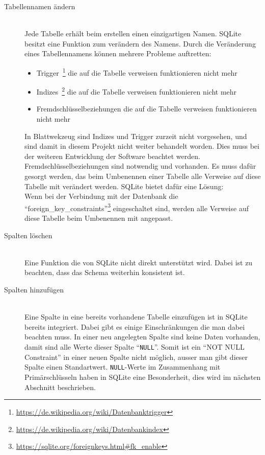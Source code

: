 \begin{description}
\item[Tabellennamen ändern] \hfill\\
Jede Tabelle erhält beim erstellen einen einzigartigen Namen. SQLite besitzt eine Funktion zum verändern des Namens.
Durch die Veränderung eines Tabellennamens können mehrere Probleme auftretten:
\begin{itemize}
    \item Trigger~\footnote{\url{https://de.wikipedia.org/wiki/Datenbanktrigger}} die auf die Tabelle verweisen funktionieren nicht mehr
    \item Indizes~\footnote{\url{https://de.wikipedia.org/wiki/Datenbankindex}} die auf die Tabelle verweisen funktionieren nicht mehr
    \item Fremdschlüsselbeziehungen die auf die Tabelle verweisen funktionieren nicht mehr
\end{itemize}
In Blattwekzeug sind Indizes und Trigger zurzeit nicht vorgesehen, und sind damit in diesem Projekt nicht weiter behandelt worden. Dies muss bei der weiteren Entwicklung der Software beachtet werden.
Fremdschlüsselbeziehungen sind notwendig und vorhanden. Es muss dafür gesorgt werden, das beim Umbenennen einer Tabelle alle Verweise auf diese Tabelle mit verändert werden. SQLite bietet dafür eine Lösung: \\
Wenn bei der Verbindung mit der Datenbank die ``foreign\_key\_constraints''\footnote{\url{https://sqlite.org/foreignkeys.html\#fk_enable}} eingeschaltet sind, werden alle Verweise auf diese Tabelle beim Umbenennen mit angepasst.\cite{sqlite_doc_alter}

\item[Spalten löschen] \hfill\\
Eine Funktion die von SQLite nicht direkt unterstützt wird. Dabei ist zu beachten, dass das Schema weiterhin konsistent ist.

\item[Spalten hinzufügen] \hfill\\
Eine Spalte in eine bereits vorhandene Tabelle einzufügen ist in SQLite bereits integriert.
Dabei gibt es einige Einschränkungen die man dabei beachten muss. In einer neu angelegten Spalte sind keine Daten vorhanden, damit sind alle Werte dieser Spalte ``\texttt{NULL}''.
Somit ist ein ``NOT NULL Constraint'' in einer neuen Spalte nicht möglich, ausser man gibt dieser Spalte einen Standartwert. \texttt{NULL}-Werte im Zusammenhang mit Primärschlüsseln haben in SQLite eine Besonderheit, dies wird im nächsten Abschnitt beschrieben.


\end{description}
